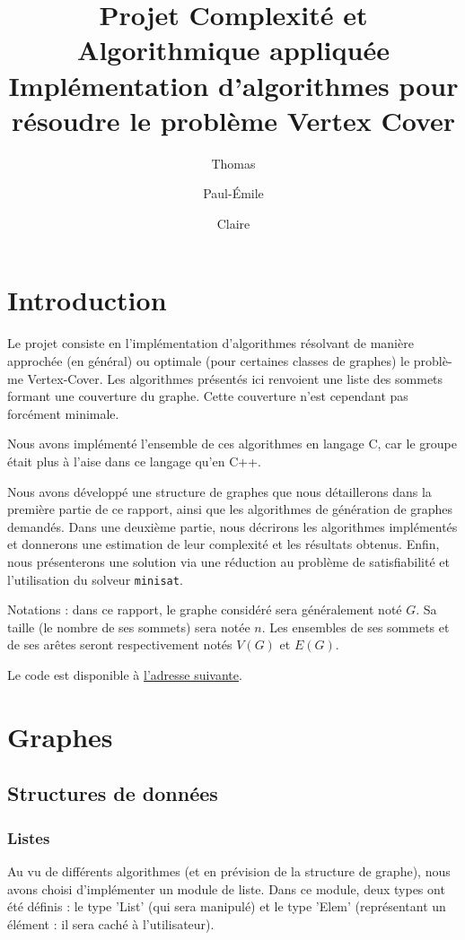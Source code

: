\documentclass[a4paper,10pt]{article}
\title{Projet Complexité et Algorithmique appliquée\\ Implémentation d'algorithmes pour résoudre le problème Vertex Cover}
\author{Thomas \bsc{Bellitto}\and Paul-Émile \bsc{Boutoille} \and Claire \bsc{Pennarun}}
\date{}
\begin{document}
\maketitle

\section*{Introduction}

Le projet consiste en l'implémentation d'algorithmes résolvant de manière approchée (en général) ou optimale (pour certaines classes de graphes) le problè-me Vertex-Cover.
Les algorithmes présentés ici renvoient une liste des sommets formant une couverture du graphe. Cette couverture n'est cependant pas forcément minimale.

Nous avons implémenté l'ensemble de ces algorithmes en langage C, car le groupe était plus à l'aise dans ce langage qu'en C++.

Nous avons développé une structure de graphes que nous détaillerons dans la première partie de ce rapport, ainsi que les algorithmes de génération de graphes demandés.
Dans une deuxième partie, nous décrirons les algorithmes implémentés et donnerons une estimation de leur complexité et les résultats obtenus.
Enfin, nous présenterons une solution via une réduction au problème de satisfiabilité et l'utilisation du solveur \texttt{minisat}.

Notations : dans ce rapport, le graphe considéré sera généralement noté $G$. Sa taille (le nombre de ses sommets) sera notée $n$. Les ensembles de ses sommets et de ses arêtes seront respectivement notés $V(G)$ et $E(G)$.

Le code est disponible à \href{http://github.com/ClairePennarun/CAA_Vertex_Cover }{l'adresse suivante}.

\section{Graphes}

\subsection{Structures de données}

\subsubsection{Listes}

Au vu de différents algorithmes (et en prévision de la structure de graphe), nous avons choisi d'implémenter un module de liste.
Dans ce module, deux types ont été définis : le type 'List' (qui sera manipulé) et le type 'Elem' (représentant un élément : il sera caché à l'utilisateur).
\end{document}
